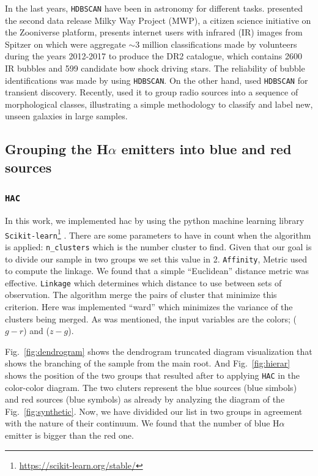 \documentclass[fleqn,usenatbib]{mnras}
\begin{document}
{In the last years, \texttt{HDBSCAN} have been in astronomy for different tasks.
\citet{Jayasinghe:2019} presented the second data release Milky Way Project (MWP), a citizen
science initiative on the Zooniverse platform, presents internet users with infrared (IR)
images from Spitzer on which were aggregate $\sim$3 million classifications made
by volunteers during the years 2012-2017 to produce the DR2 catalogue, which
contains 2600 IR bubbles and 599 candidate bow shock driving stars.
The reliability of bubble identifications was made by using \texttt{HDBSCAN}.
On the other hand, \citet{Webb:2020} used \texttt{HDBSCAN} for transient discovery.
Recently, \citet{Ntwaetsile:2021} used it to group radio sources into a sequence
of morphological classes, illustrating a simple methodology to classify and
label new, unseen galaxies in large samples. 

\subsection{Grouping the H{$\alpha$} emitters into blue and red sources}
\label{sec:apply-hac-hdebscan}

\subsubsection{\texttt{HAC}}

In this work, we implemented {\sc hac} by using the python machine learning library
\texttt{Scikit-learn}\footnote{\url{https://scikit-learn.org/stable/}} \citep{Pedregosa:2011}.
There are some parameters to have in count
when the algorithm is applied: \texttt{n\_clusters} which is the number cluster to find. Given
that our goal is to divide our sample in two groups we set this value in 2. \texttt{Affinity},
Metric used to compute the linkage. We found that a simple ``Euclidean'' distance metric was
effective. \texttt{Linkage} which determines which distance to use between sets of observation.
The algorithm merge the pairs of cluster that minimize this criterion. Here was implemented
``ward'' which minimizes the variance of the clusters being merged. As was mentioned,
the input variables are the colors; ($g - r$) and ($z - g$).

Fig.~\ref{fig:dendrogram} shows the dendrogram truncated diagram visualization that
shows the branching of the sample from the main root. And Fig.~\ref{fig:hierar} shows
the position of the two groups that resulted after to applying \texttt{HAC} in the
color-color diagram. The two cluters represent the blue sources (blue simbols)
and red sources (blue symbols) as already by analyzing the diagram of the
Fig.~\ref{fig:synthetic}. Now, we have dividided our list in two groups in agreement
with the nature of their continuum. We found that the number of blue H{$\alpha$}
emitter is bigger than the red one.

}
\end{document}
